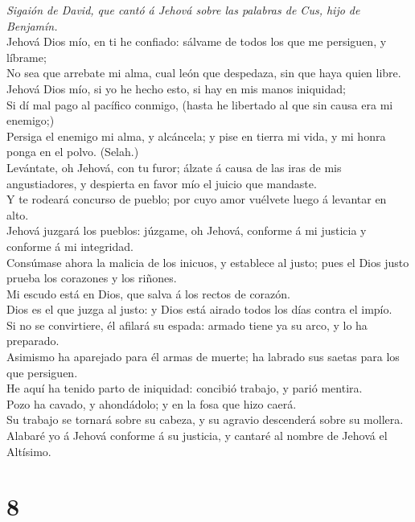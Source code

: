  \emph{Sigaión de David, que cantó á Jehová sobre las
palabras de Cus, hijo de Benjamín.}\\
Jehová Dios mío, en ti he confiado: sálvame de todos los que me
persiguen, y líbrame;\\
 No sea que arrebate mi alma, cual león que despedaza, sin
que haya quien libre.\\
 Jehová Dios mío, si yo he hecho esto, si hay en mis manos
iniquidad;\\
 Si dí mal pago al pacífico conmigo, (hasta he libertado al
que sin causa era mi enemigo;)\\
 Persiga el enemigo mi alma, y alcáncela; y pise en tierra
mi vida, y mi honra ponga en el polvo. (Selah.)\\
 Levántate, oh Jehová, con tu furor; álzate á causa de las
iras de mis angustiadores, y despierta en favor mío el juicio que
mandaste.\\
 Y te rodeará concurso de pueblo; por cuyo amor vuélvete
luego á levantar en alto.\\
 Jehová juzgará los pueblos: júzgame, oh Jehová, conforme á
mi justicia y conforme á mi integridad.\\
 Consúmase ahora la malicia de los inicuos, y establece al
justo; pues el Dios justo prueba los corazones y los riñones.\\
 Mi escudo está en Dios, que salva á los rectos de
corazón.\\
 Dios es el que juzga al justo: y Dios está airado todos
los días contra el impío.\\
 Si no se convirtiere, él afilará su espada: armado tiene
ya su arco, y lo ha preparado.\\
 Asimismo ha aparejado para él armas de muerte; ha labrado
sus saetas para los que persiguen.\\
 He aquí ha tenido parto de iniquidad: concibió trabajo, y
parió mentira.\\
 Pozo ha cavado, y ahondádolo; y en la fosa que hizo
caerá.\\
 Su trabajo se tornará sobre su cabeza, y su agravio
descenderá sobre su mollera.\\
 Alabaré yo á Jehová conforme á su justicia, y cantaré al
nombre de Jehová el Altísimo.

\hypertarget{section-7}{%
\section{8}\label{section-7}}

